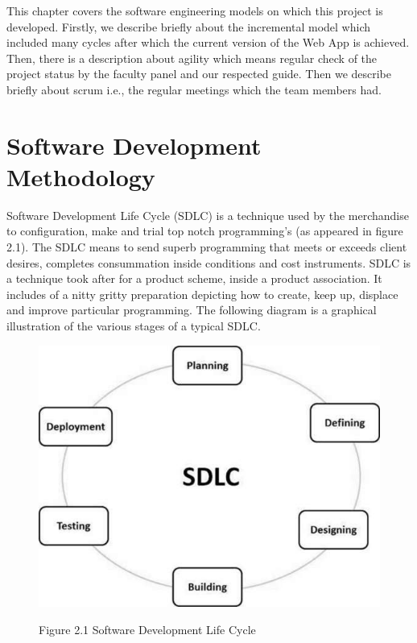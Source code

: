 \documentclass{book}
\begin{document}
    This chapter covers the software engineering models on which this project is developed. Firstly, we describe briefly about the incremental model which included many cycles after which the current version of the Web App is achieved. Then, there is a description about agility which means regular check of the project status by the faculty panel and our respected guide. Then we describe briefly about scrum i.e., the regular meetings which the team members had.
    \section{Software Development Methodology}
    	Software Development Life Cycle (SDLC) is a technique used by the merchandise to configuration, make and trial top notch programming's (as appeared in figure 2.1). The SDLC means to send superb programming that meets or exceeds client desires, completes consummation inside conditions and cost instruments. SDLC is a technique took after for a product scheme, inside a product association. It includes of a nitty gritty preparation depicting how to create, keep up, displace and improve particular programming. The following diagram is a graphical illustration of the various stages of a typical SDLC.
    	
    	\begin{figure}
    		\includegraphics[]{images/sdlc.png}
    		
    		\begin{center}
    			Figure 2.1 Software Development Life Cycle
    		\end{center}
    	\end{figure}
    
\end{document}
